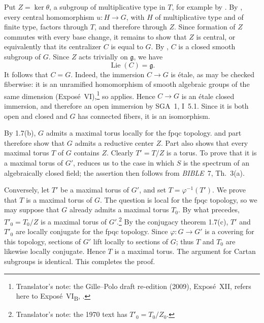\textup{} Put \(Z=\ker\theta\), a subgroup of multiplicative type
in \(T\), for example by . By , every central homomorphism
\(u:H\to G\), with \(H\) of multiplicative type and of finite type,
factors through \(T\), and therefore through \(Z\). Since formation
of \(Z\) commutes with every base change, it remains to show that
\(Z\) is central, or equivalently that its centralizer \(C\) is
equal to \(G\). By , \(C\) is a closed smooth subgroup of
\(G\). Since \(Z\) acts trivially on \(\mathfrak g\), we have
\[
  \operatorname{Lie}(C)=\mathfrak g.
\]
It follows that \(C=G\). Indeed, the immersion \(C\to G\) is étale,
as may be checked fiberwise: it is an unramified homomorphism of
smooth algebraic groups of the same dimension
\textup{(Exposé~VI)},\footnote{Translator's note: the Gille--Polo draft
re-edition (2009), Exposé~XII, refers here to Exposé~VI\textsubscript{B},
.} so  applies. Hence
\(C\to G\) is an étale closed immersion, and therefore an open
immersion by SGA~1, I~5.1. Since it is both open and closed and \(G\)
has connected fibers, it is an isomorphism.

\textup{} By 1.7(b), \(G\) admits a maximal torus locally for the
fpqc topology.  and part \textup{} therefore show
that \(G\) admits a reductive center \(Z\). Part \textup{} also
shows that every maximal torus \(T\) of \(G\) contains \(Z\).
Clearly \(T'=T/Z\) is a torus. To prove that it is a maximal torus
of \(G'\),  reduces us to the case in which \(S\) is
the spectrum of an algebraically closed field; the assertion then
follows from \emph{BIBLE}~7, Th.~3(a).

Conversely, let \(T'\) be a maximal torus of \(G'\), and set
\(T=\varphi^{-1}(T')\). We prove that \(T\) is a maximal torus of
\(G\). The question is local for the fpqc topology, so we may
suppose that \(G\) already admits a maximal torus \(T_0\). By what
precedes, \(T'_0=T_0/Z\) is a maximal torus of
\(G'\).\footnote{Translator's note: the 1970 text has
\(T'_0=T_0/Z_0\).} By the
conjugacy theorem 1.7(c), \(T'\) and \(T'_0\) are locally conjugate
for the fpqc topology. Since \(\varphi:G\to G'\) is a covering for
this topology, sections of \(G'\) lift locally to sections of \(G\);
thus \(T\) and \(T_0\) are likewise locally conjugate. Hence \(T\)
is a maximal torus. The argument for Cartan subgroups is identical.
This completes the proof.

